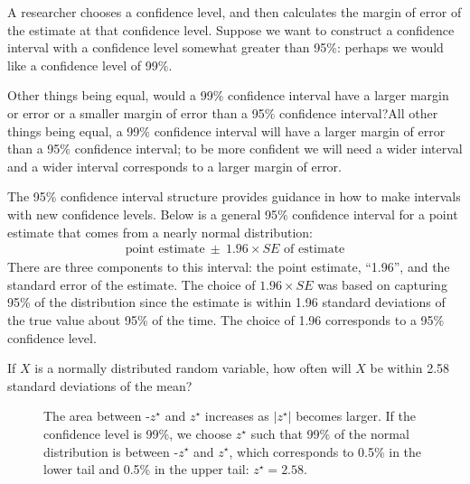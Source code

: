 
A researcher chooses a confidence level, and then calculates the margin of error of the estimate at that confidence level.  Suppose we want to construct a confidence interval with a confidence level somewhat greater than 95\%: perhaps we would like a confidence level of 99\%. 

\begin{examplewrap}
\begin{nexample}{Other things being equal, would a 99\% confidence interval have a larger margin or error or a smaller margin of error than a 95\% confidence interval?}All other things being equal, a 99\% confidence interval will have a larger margin of error than a 95\% confidence interval; to be more confident we will need a wider interval and a wider interval corresponds to a larger margin of error.
\end{nexample}
\end{examplewrap}

The 95\% confidence interval structure provides guidance in how to make intervals with new confidence levels. Below is a general 95\% confidence interval for a point estimate that comes from a nearly normal distribution:
\begin{align*}
\text{point estimate}\ \pm\ 1.96\times SE \text{ of estimate}
\end{align*}
There are three components to this interval: the point estimate, ``1.96'', and the standard error of the estimate. The choice of $1.96\times SE$ was based on capturing 95\% of the distribution since the estimate is within 1.96 standard deviations of the true value about 95\% of the time. The choice of 1.96 corresponds to a 95\% confidence level. 

\begin{exercisewrap}
\begin{nexercise} \label{leadInForMakingA99PercentCIExercise}
If $X$ is a normally distributed random variable, how often will $X$ be within 2.58 standard deviations of the mean?\footnotemark
\end{nexercise}
\end{exercisewrap}


\begin{figure}[ht]
\centering
{}
\caption{The area between -$z^{\star}$ and $z^{\star}$ increases as $|z^{\star}|$ becomes larger. If the confidence level is 99\%, we choose $z^{\star}$ such that 99\% of the normal distribution is between -$z^{\star}$ and $z^{\star}$, which corresponds to 0.5\% in the lower tail and 0.5\% in the upper tail: $z^{\star}=2.58$.}
\label{choosingZForCI}
\end{figure}

